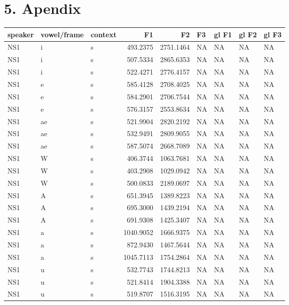 \documentclass[man, fleqn, noextraspace]{apa6}
\begin{document}
\section{\texorpdfstring{\textbf{5.
Apendix}}{5. Apendix}}\label{apendix}

\begin{tabular}{l|l|l|r|r|l|l|l|l}
\hline
speaker & vowel/frame & context & F1 & F2 & F3 & gl F1 & gl F2 & gl F3\\
\hline
NS1 & i & s & 493.2375 & 2751.1464 & NA & NA & NA & NA\\
\hline
NS1 & i & s & 507.5334 & 2865.6353 & NA & NA & NA & NA\\
\hline
NS1 & i & s & 522.4271 & 2776.4157 & NA & NA & NA & NA\\
\hline
NS1 & e & s & 585.4128 & 2708.4025 & NA & NA & NA & NA\\
\hline
NS1 & e & s & 584.2901 & 2706.7544 & NA & NA & NA & NA\\
\hline
NS1 & e & s & 576.3157 & 2553.8634 & NA & NA & NA & NA\\
\hline
NS1 & ae & s & 521.9904 & 2820.2192 & NA & NA & NA & NA\\
\hline
NS1 & ae & s & 532.9491 & 2809.9055 & NA & NA & NA & NA\\
\hline
NS1 & ae & s & 587.5074 & 2668.7089 & NA & NA & NA & NA\\
\hline
NS1 & W & s & 406.3744 & 1063.7681 & NA & NA & NA & NA\\
\hline
NS1 & W & s & 403.2908 & 1029.0942 & NA & NA & NA & NA\\
\hline
NS1 & W & s & 500.0833 & 2189.0697 & NA & NA & NA & NA\\
\hline
NS1 & A & s & 651.3945 & 1389.8223 & NA & NA & NA & NA\\
\hline
NS1 & A & s & 695.3000 & 1439.2194 & NA & NA & NA & NA\\
\hline
NS1 & A & s & 691.9308 & 1425.3407 & NA & NA & NA & NA\\
\hline
NS1 & a & s & 1040.9052 & 1666.9375 & NA & NA & NA & NA\\
\hline
NS1 & a & s & 872.9430 & 1467.5644 & NA & NA & NA & NA\\
\hline
NS1 & a & s & 1045.7113 & 1754.2864 & NA & NA & NA & NA\\
\hline
NS1 & u & s & 532.7743 & 1744.8213 & NA & NA & NA & NA\\
\hline
NS1 & u & s & 521.8414 & 1904.3388 & NA & NA & NA & NA\\
\hline
NS1 & u & s & 519.8707 & 1516.3195 & NA & NA & NA & NA\\

\end{tabular}
\end{document}
